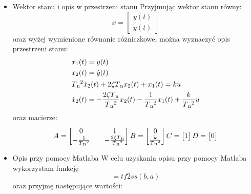 \documentclass[a4paper,10pt]{article}
\begin{document}
\begin{itemize}
\begin{itemize}
	\item Wektor stanu i opis w przestrzeni stanu
	\newline Przyjmując wektor stanu równy:
	\begin{equation}
	x =\begin{bmatrix}
	y(t) \\
	\dot{y}(t)
	\end{bmatrix}
	\end{equation}
	oraz wyżej wymienione równanie różniczkowe, można wyznaczyć opis przestrzeni stanu:
	\begin{equation}
	\begin{split}
	&x\textsubscript 1 (t) = y(t)\\
	&x\textsubscript 2 (t) = \dot{y}(t)\\
	&T\textsubscript n ^2 \dot{x}\textsubscript 2 (t) + 2 \zeta T\textsubscript n x\textsubscript 2 (t) + x\textsubscript 1 (t) = ku\\
	&\dot{x}\textsubscript 2 (t) = -\frac{2\zeta T\textsubscript n}{T\textsubscript n ^2} x\textsubscript 2 (t) - \frac{1}{T\textsubscript n ^2} x\textsubscript 1 (t) + \frac{k}{T\textsubscript n ^2} u\\
	\end{split}
	\end{equation}
	oraz macierze:
	\begin{equation}
	A =
	\begin{bmatrix}
	0 && 1 \\
	-\frac{1}{T\textsubscript n ^2} && -\frac{2\zeta T\textsubscript n }{T\textsubscript n ^2}
	\end{bmatrix}\\
	B =
	\begin{bmatrix}
	0 \\
	\frac{k}{{T\textsubscript n} ^2}
	\end{bmatrix}\\
	C =
	\begin{bmatrix}
	1
	\end{bmatrix}\\
	D =
	\begin{bmatrix}
	0
	\end{bmatrix}
	\end{equation}
	\item Opis przy pomocy Matlaba
	W celu uzyskania opisu przy pomocy Matlaba wykorzystam funkcję
	\begin{equation}
	[A,B,C,D]
	= tf2ss(b,a)
	\end{equation}
	oraz przyjmę następujące wartości:
	\begin{equation}

\end{equation}
\end{itemize}
\end{itemize}
\end{document}
